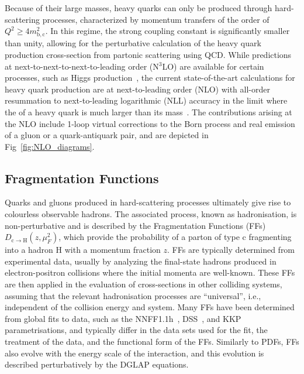 Because of their large masses, heavy quarks can only be produced through hard-scattering processes, characterized by momentum transfers of the order of $Q^2 \geq 4m^2_\mathrm{b,c}$. In this regime, the strong coupling constant is significantly smaller than unity, allowing for the perturbative calculation of the heavy quark production cross-section from partonic scattering using QCD. While predictions at next-to-next-to-next-to-leading order (N$^3$LO) are available for certain processes, such as Higgs production~\cite{Anastasiou:2015vya, Anastasiou:2016cez}, the current state-of-the-art calculations for heavy quark production are at next-to-leading order (NLO) with all-order resummation to next-to-leading logarithmic (NLL) accuracy in the limit where the \pt of a heavy quark is much larger than its mass~\cite{Cacciari:1998it}. The contributions arising at the NLO include 1-loop virtual corrections to the Born process and real emission of a gluon or a quark-antiquark pair, and are depicted in Fig~\ref{fig:NLO_diagrams}.

\subsection{Fragmentation Functions}
\begin{sloppypar}
Quarks and gluons produced in hard-scattering processes ultimately give rise to colourless observable hadrons. The associated process, known as hadronisation, is non-perturbative and is described by the Fragmentation Functions (FFs) $D_\mathrm{c\rightarrow H}(z,\mu_F^2)$, which provide the probability of a parton of type c fragmenting into a hadron H with a momentum fraction $z$. FFs are typically determined from experimental data, usually by analyzing the final-state hadrons produced in electron-positron collisions where the initial momenta are well-known. These FFs are then applied in the evaluation of cross-sections in other colliding systems, assuming that the relevant hadronisation processes are “universal”, i.e., independent of the collision energy and system. Many FFs have been determined from global fits to data, such as the NNFF1.1h~\cite{Bertone:2018ecm}, DSS~\cite{deFlorian:2007aj}, and KKP~\cite{Kniehl:2000fe} parametrisations, and typically differ in the data sets used for the fit, the treatment of the data, and the functional form of the FFs. Similarly to PDFs, FFs also evolve with the energy scale of the interaction, and this evolution is described perturbatively by the DGLAP equations. 
\end{sloppypar}

